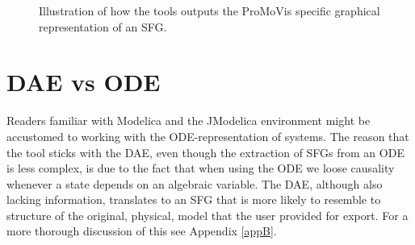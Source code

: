 \begin{figure}
\caption{Illustration of how the tools outputs the ProMoVis specific graphical representation of an SFG.}
\label{fig:promosfg}
\end{figure}
%  
\section{DAE vs ODE}
Readers familiar with Modelica and the JModelica environment might be accustomed to working with the ODE-representation of systems. The reason that the tool sticks with the DAE, even though the extraction of SFGs from an ODE is less complex, is due to the fact that when using the ODE we loose causality whenever a state depends on an algebraic variable. The DAE, although also lacking information, translates to an SFG that is more likely to resemble to structure of the original, physical, model that the user provided for export. For a more thorough discussion of this see Appendix \ref{appB}.



